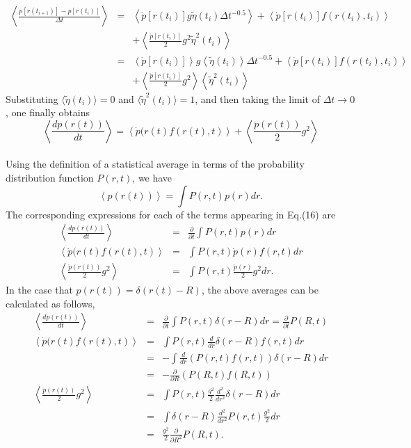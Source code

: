 \documentclass[a4paper,11pt]{article}
\begin{document}
\begin{eqnarray}
\left\langle\frac{p\left[r(t_{i+1})\right]-p\left[r(t_i)\right]}{\Delta t}\right\rangle
&=&
\left\langle \dot{p}\left[r(t_{i})\right]g\tilde{\eta}(t_i)\Delta t^{-0.5}\right\rangle
+\left\langle \dot{p}\left[r(t_{i})\right]f(r(t_i),t_i)\right\rangle\nonumber\\
&&+\left\langle\frac{\ddot{p}\left[r(t_{i})\right]}{2}g^2\tilde{\eta}^2(t_i)\right\rangle\\
&=&
\left\langle \dot{p}\left[r(t_{i})\right]\right\rangle g\left\langle\tilde{\eta}(t_i)\right\rangle\Delta t^{-0.5}
+\left\langle \dot{p}\left[r(t_{i})\right]f(r(t_i),t_i)\right\rangle\nonumber\\
&&+\left\langle\frac{\ddot{p}\left[r(t_{i})\right]}{2}g^2\right\rangle\left\langle\tilde{\eta}^2(t_i)\right\rangle
\end{eqnarray}
Substituting $\langle\tilde{\eta}(t_i)\rangle=0$ and $\langle\tilde{\eta}^2(t_i)\rangle=1$, and then taking the limit of $\Delta t\rightarrow 0$, one finally obtains
\begin{equation}
  \left\langle\frac{dp(r(t))}{dt}\right\rangle
  =\left\langle \dot{p}(r(t)f(r(t),t)\right\rangle+\left\langle\frac{\ddot{p}(r(t))}{2}g^2\right\rangle
\end{equation}
\\
Using the definition of a statistical average in terms of the
probability distribution function $P(r,t)$, we have
\begin{equation}
\left\langle p(r(t))\right\rangle=\int P(r,t)p(r)dr.
\end{equation}
The corresponding expressions for each of the terms appearing in
Eq.(16) are
\begin{eqnarray}
\left\langle \frac{dp(r(t))}{dt}\right\rangle&=&\frac{\partial}{\partial t}\int P(r,t)p(r)dr\\
\left\langle \dot{p}(r(t)f(r(t),t)\right\rangle&=&\int P(r,t)\dot{p}(r)f(r,t)dr\\
\left\langle \frac{\ddot{p}(r(t))}{2}g^2\right\rangle&=&\int P(r,t)\frac{\ddot{p}(r)}{2}g^2dr.
\end{eqnarray}
In the case that 
$p(r(t))=\delta(r(t)-R)$, the above averages can be calculated as follows,
\begin{eqnarray}
\left\langle \frac{dp(r(t))}{dt}\right\rangle&=&\frac{\partial}{\partial t}\int P(r,t)\delta(r-R)dr=\frac{\partial}{\partial t}P(R,t)\\
\left\langle \dot{p}(r(t)f(r(t),t)\right\rangle&=&\int P(r,t)\frac{d}{dr}\delta(r-R)f(r,t)dr\\
&=&-\int \frac{d}{dr}\left(P(r,t)f(r,t)\right)\delta(r-R)dr\\
&=&-\frac{\partial}{\partial  R}\left(P(R,t)f(R,t)\right)\\
\left\langle \frac{\ddot{p}(r(t))}{2}g^2\right\rangle&=&\int P(r,t)\frac{g^2}{2}\frac{d^2}{dr^2}\delta(r-R)dr\\
&=&\int \delta(r-R)\frac{d^2}{dr^2}P(r,t)\frac{g^2}{2}dr\\
&=&\frac{g^2}{2}\frac{\partial}{\partial R^2}P(R,t).
\end{eqnarray}
\end{document}
